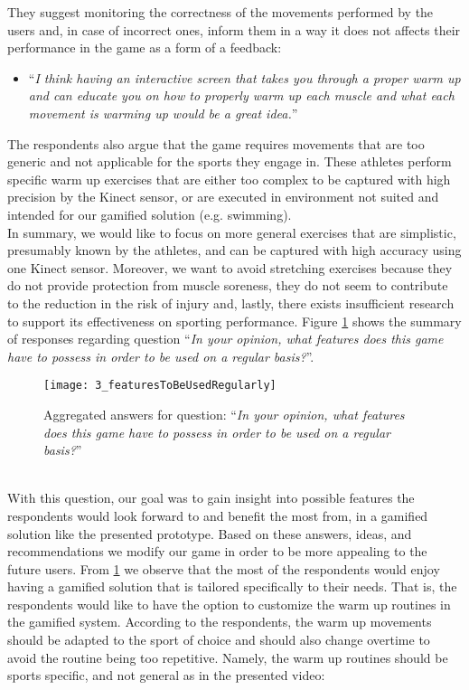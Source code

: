 They suggest monitoring the correctness of the movements performed by the users and, in case of incorrect ones, inform them in a way it does not affects their performance in the game as a form of a feedback:
\begin{itemize}
\item ``\textit{I think having an interactive screen that takes you through a proper warm up and can educate you on how to properly warm up each muscle and what each movement is warming up would be a great idea.}''
\end{itemize}
The respondents also argue that the game requires movements that are too generic and not applicable for the sports they engage in. These athletes perform specific warm up exercises that are either too complex to be captured with high precision by the Kinect sensor, or are executed in environment not suited and intended for our gamified solution (e.g. swimming). \\In summary, we would like to focus on more general exercises that are simplistic, presumably known by the athletes, and can be captured with high accuracy using one Kinect sensor. Moreover, we want to avoid stretching exercises because they do not provide protection from muscle soreness, they do not seem to contribute to the reduction in the risk of injury and, lastly, there exists insufficient research to support its effectiveness on sporting performance.  Figure \ref{fig:3_featuresToBeUsedRegularly} shows the summary of responses regarding question ``\textit{In your opinion, what features does this game have to possess in order to be used on a regular basis?}''.\\
\begin{figure}[h]
    \centering
    \texttt{[image: 3\_featuresToBeUsedRegularly]}
    \caption{Aggregated answers for question: ``\textit{In your opinion, what features does this game have to possess in order to be used on a regular basis?}''}
    \label{fig:3_featuresToBeUsedRegularly}
\end{figure}\\
With this question, our goal was to gain insight into possible features the respondents would look forward to and benefit the most from, in a gamified solution like the presented prototype. Based on these answers, ideas, and recommendations we modify our game in order to be more appealing to the future users. From \ref{fig:3_featuresToBeUsedRegularly} we observe that the most of the respondents would enjoy having a gamified solution that is tailored specifically to their needs. That is, the respondents would like to have the option to customize the warm up routines in the gamified system. According to the respondents, the warm up movements should be adapted to the sport of choice and should also change overtime to avoid the routine being too repetitive. Namely, the warm up routines should be sports specific, and not general as in the presented video:
